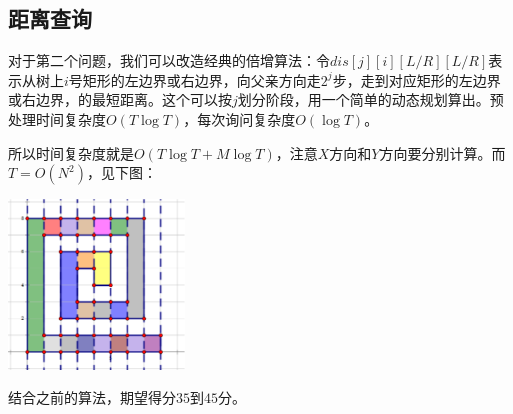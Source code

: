 \documentclass[a4paper]{article}
\begin{document}
\subsection{距离查询}
对于第二个问题，我们可以改造经典的倍增算法：令$dis[j][i][L/R][L/R]$表示从树上$i$号矩形的左边界或右边界，向父亲方向走$2^j$步，走到对应矩形的左边界或右边界，的最短距离。这个可以按$j$划分阶段，用一个简单的动态规划算出。预处理时间复杂度$O(T\log{T})$，每次询问复杂度$O(\log{T})$。 \par
\vspace{15pt}
所以时间复杂度就是$O(T\log{T} + M\log{T})$，注意$X$方向和$Y$方向要分别计算。而$T=O(N^2)$，见下图：
\begin{center}
\includegraphics[height=128pt]{maze_2.eps}
\end{center}
\par
结合之前的算法，期望得分$35$到$45$分。
\end{document}
